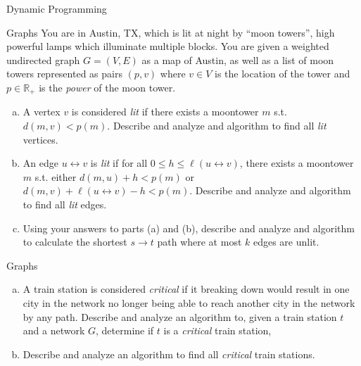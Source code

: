 \documentclass{beamer}
\begin{document}
\begin{frame}[t]{Dynamic Programming}
\end{frame}


\begin{frame}[t]{Graphs}
   You are in Austin, TX, which is lit at night by ``moon towers'', high powerful lamps which illuminate multiple blocks. You are given a weighted undirected graph $G = (V,E)$ as a map of Austin, as well as a list of moon towers represented as pairs $(p, v)$ where $v \in V$ is the location of the tower and $p \in \mathbb{R}_+$ is the \textit{power} of the moon tower. 
   \begin{enumerate}[(a)]
       \item<1-> A vertex $v$ is considered \textit{lit} if there exists a moontower $m$ s.t. $d(m, v) < p(m)$. Describe and analyze and algorithm to find all \textit{lit} vertices.

       \item<2-> An edge $u \leftrightarrow v$ is \textit{lit} if for all $0 \leq h \leq \ell(u \leftrightarrow v)$, there exists a moontower $m$ s.t. either $d(m, u) + h < p(m)$ or $d(m, v) + \ell(u \leftrightarrow v) - h < p(m)$. Describe and analyze and algorithm to find all \textit{lit} edges.

       \item<3-> Using your answers to parts (a) and (b), describe and analyze and algorithm to calculate the shortest $s \rightarrow t$ path where at most $k$ edges are unlit.
   \end{enumerate}
\end{frame}

\begin{frame}[t]{Graphs} 
   \begin{enumerate}[(a)]
       \item<1-> A train station is considered \textit{critical} if it breaking down would result in one city in the network no longer being able to reach another city in the network by any path. Describe and analyze an algorithm to, given a train station $t$ and a network $G$, determine if $t$ is a \textit{critical} train station,

       \item<2-> Describe and analyze an algorithm to find all \textit{critical} train stations. 
   \end{enumerate}
\end{frame}
\end{document}

